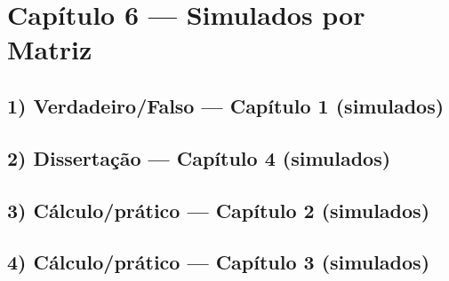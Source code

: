 \documentclass[11pt,a4paper]{article}
\begin{document}
\clearpage
\section{Capítulo 6 — Simulados por Matriz}
\subsection{1) Verdadeiro/Falso — Capítulo 1 (simulados)}
\clearpage
\subsection{2) Dissertação — Capítulo 4 (simulados)}
\clearpage
\subsection{3) Cálculo/prático — Capítulo 2 (simulados)}
\clearpage
\subsection{4) Cálculo/prático — Capítulo 3 (simulados)}
\clearpage
\end{document}
